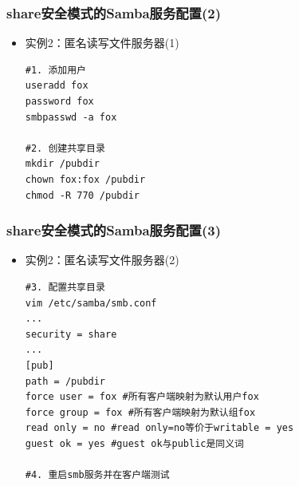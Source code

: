 \documentclass[xcolor=svgnames,presentation]{beamer}
\begin{document}
\begin{frame}[fragile]
\frametitle{share安全模式的Samba服务配置(2)}
\label{sec-2-21}
\begin{itemize}

\item 实例2：匿名读写文件服务器(1)\\
\label{sec-2-21-1}%
\begin{verbatim}
#1. 添加用户
useradd fox
password fox
smbpasswd -a fox

#2. 创建共享目录
mkdir /pubdir
chown fox:fox /pubdir
chmod -R 770 /pubdir
\end{verbatim}
\end{itemize} %
\end{frame}
\begin{frame}[fragile]
\frametitle{share安全模式的Samba服务配置(3)}
\label{sec-2-22}
\begin{itemize}

\item 实例2：匿名读写文件服务器(2)\\
\label{sec-2-22-1}%
\begin{verbatim}
#3. 配置共享目录
vim /etc/samba/smb.conf
...
security = share
...
[pub]
path = /pubdir
force user = fox #所有客户端映射为默认用户fox
force group = fox #所有客户端映射为默认组fox
read only = no #read only=no等价于writable = yes
guest ok = yes #guest ok与public是同义词

#4. 重启smb服务并在客户端测试
\end{verbatim}
\end{itemize} %
\end{frame}
\end{document}

